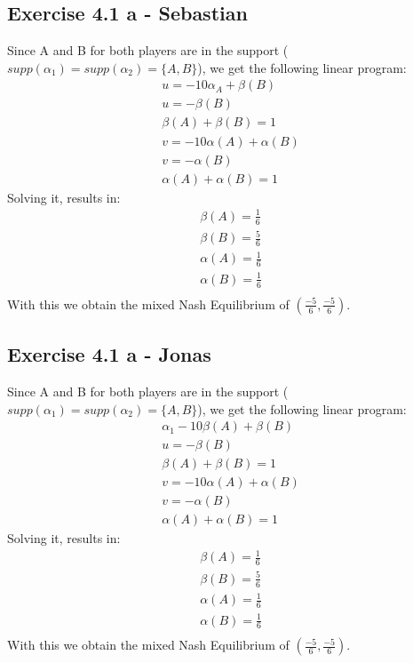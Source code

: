 \documentclass[a4paper,
  twoside, %
  headlines=2.1 %
  ]{scrartcl}
\author{\yourname}
\title{\vspace{-20mm}\lecture}
\subtitle{Exercise Sheet 3}
\date{} %
\begin{document}
\maketitle
\subsection*{Exercise 4.1 a - Sebastian}
Since A and B for both players are in the support ($supp(\alpha_1)=supp(\alpha_2)=\lbrace A, B \rbrace$), we get the following linear program:
\begin{align}
    u = -10 \alpha_A + \beta(B)\\
    u = -\beta(B)\\
    \beta(A) +\beta(B) = 1\\
    v=-10\alpha(A)+\alpha(B)\\
    v = - \alpha(B)\\
    \alpha(A) + \alpha(B) = 1
\end{align}
Solving it, results in:
\begin{align}
    \beta(A) =\frac{1}{6}\\
    \beta(B) = \frac{5}{6}\\
    \alpha(A) = \frac{1}{6}\\
    \alpha(B) = \frac{1}{6}\\
\end{align}
With this we obtain the mixed Nash Equilibrium of $(\frac{-5}{6}, \frac{-5}{6})$. 

\subsection*{Exercise 4.1 a - Jonas}
Since A and B for both players are in the support ($supp(\alpha_1)=supp(\alpha_2)=\lbrace A, B \rbrace$), we get the following linear program:
\begin{align}
    \alpha_1 -10 \beta(A) + \beta(B)\\
    u = -\beta(B)\\
    \beta(A) +\beta(B) = 1\\
    v=-10\alpha(A)+\alpha(B)\\
    v = - \alpha(B)\\
    \alpha(A) + \alpha(B) = 1
\end{align}
Solving it, results in:
\begin{align}
    \beta(A) =\frac{1}{6}\\
    \beta(B) = \frac{5}{6}\\
    \alpha(A) = \frac{1}{6}\\
    \alpha(B) = \frac{1}{6}\\
\end{align}
With this we obtain the mixed Nash Equilibrium of $(\frac{-5}{6}, \frac{-5}{6})$. 
\end{document}
